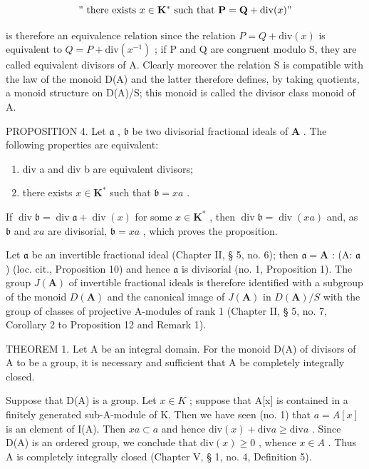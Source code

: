 \[
" \text { there   exists } x \in \mathbf {K} ^ {*} \text { such   that } \mathbf {P} = \mathbf {Q} + \operatorname{div} (x)"
\]

is therefore an equivalence relation since the relation \(P = Q + \text{div}(x)\) is equivalent to \(Q = P + \text{div}(x^{-1})\) ; if P and Q are congruent modulo S, they are called equivalent divisors of A. Clearly moreover the relation S is compatible with the law of the monoid D(A) and the latter therefore defines, by taking quotients, a monoid structure on D(A)/S; this monoid is called the divisor class monoid of A.

PROPOSITION 4. Let \(\mathfrak{a}\) , \(\mathfrak{b}\) be two divisorial fractional ideals of \(\mathbf{A}\) . The following properties are equivalent:

\begin{enumerate}
\def\labelenumi{(\alph{enumi})}
\item
  div a and div b are equivalent divisors;
\item
  there exists \(x \in \mathbf{K}^*\) such that \(\mathfrak{b} = xa\) .
\end{enumerate}

If \(\operatorname{div} \mathfrak{b} = \operatorname{div} \mathfrak{a} + \operatorname{div}(x)\) for some \(x \in \mathbf{K}^*\) , then \(\operatorname{div} \mathfrak{b} = \operatorname{div}(xa)\) and, as \(\mathfrak{b}\) and \(xa\) are divisorial, \(\mathfrak{b} = xa\) , which proves the proposition.

Let \(\mathfrak{a}\) be an invertible fractional ideal (Chapter II, § 5, no. 6); then \(\mathfrak{a} = \mathbf{A}\) : (A: \(\mathfrak{a}\) ) (loc. cit., Proposition 10) and hence \(\mathfrak{a}\) is divisorial (no. 1, Proposition 1). The group \(J(\mathbf{A})\) of invertible fractional ideals is therefore identified with a subgroup of the monoid \(D(\mathbf{A})\) and the canonical image of \(J(\mathbf{A})\) in \(D(\mathbf{A}) / S\) with the group of classes of projective A-modules of rank 1 (Chapter II, § 5, no. 7, Corollary 2 to Proposition 12 and Remark 1).

THEOREM 1. Let A be an integral domain. For the monoid D(A) of divisors of A to be a group, it is necessary and sufficient that A be completely integrally closed.

Suppose that D(A) is a group. Let \(x \in K\) ; suppose that A{[}x{]} is contained in a finitely generated sub-A-module of K. Then we have seen (no. 1) that \(a = A[x]\) is an element of I(A). Then \(xa \subset a\) and hence \(\text{div}(x) + \text{div}a \geqslant \text{div}a\) . Since D(A) is an ordered group, we conclude that \(\text{div}(x) \geqslant 0\) , whence \(x \in A\) . Thus A is completely integrally closed (Chapter V, § 1, no. 4, Definition 5).

